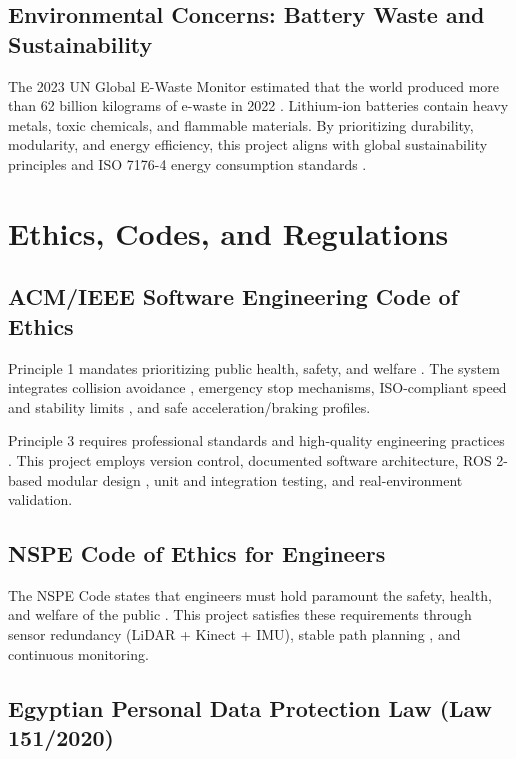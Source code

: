 \documentclass[12pt,a4paper]{report}
\begin{document}
\subsection{Environmental Concerns: Battery Waste and Sustainability}

The 2023 UN Global E-Waste Monitor estimated that the world produced more than 62 billion kilograms of e-waste in 2022 \cite{un_ewaste}. Lithium-ion batteries contain heavy metals, toxic chemicals, and flammable materials. By prioritizing durability, modularity, and energy efficiency, this project aligns with global sustainability principles and ISO 7176-4 energy consumption standards \cite{iso7176_4}.

\section{Ethics, Codes, and Regulations}

\subsection{ACM/IEEE Software Engineering Code of Ethics}

Principle 1 mandates prioritizing public health, safety, and welfare \cite{acm_ieee_code}. The system integrates collision avoidance \cite{iso13482}, emergency stop mechanisms, ISO-compliant speed and stability limits \cite{iso7176_6}, and safe acceleration/braking profiles.

Principle 3 requires professional standards and high-quality engineering practices \cite{acm_ieee_code}. This project employs version control, documented software architecture, ROS 2-based modular design \cite{ros2}, unit and integration testing, and real-environment validation.

\subsection{NSPE Code of Ethics for Engineers}

The NSPE Code states that engineers must hold paramount the safety, health, and welfare of the public \cite{nspe_code}. This project satisfies these requirements through sensor redundancy (LiDAR + Kinect + IMU), stable path planning \cite{nav2}, and continuous monitoring.

\subsection{Egyptian Personal Data Protection Law (Law 151/2020)}
\end{document}
